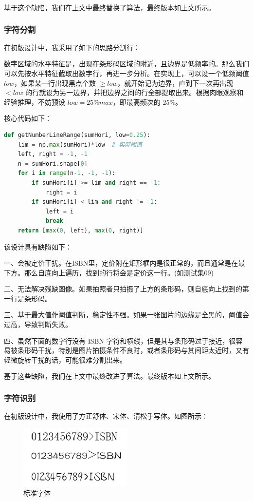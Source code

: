 \documentclass{ctexart}
\begin{document}
基于这个缺陷，我们在上文中最终替换了算法，最终版本如上文所示。

\subsubsection{字符分割}
在初版设计中，我采用了如下的思路分割行：

数字区域的水平特征是，出现在条形码区域的附近，且边界是低频率的。那么我们可以先按水平特征截取出数字行，再进一步分析。在实现上，可以设一个低频阈值 $low$，如果某一行出现黑点个数 $\ge low$，就开始记为边界，直到下一次再出现 $< low$ 的行就设为另一边界，并把边界之间的行全部提取出来。根据肉眼观察和经验推理，不妨预设 $low=25\%max$，即最高频次的 $25\%$。

核心代码如下：
\begin{lstlisting}[language=python]
def getNumberLineRange(sumHori, low=0.25):
    lim = np.max(sumHori)*low  # 实际阈值
    left, right = -1, -1
    n = sumHori.shape[0]
    for i in range(n-1, -1, -1):
        if sumHori[i] >= lim and right == -1:
            right = i
        if sumHori[i] < lim and right != -1:
            left = i
            break
    return [max(0, left), max(0, right)]
\end{lstlisting}

该设计具有缺陷如下：

一、会被定价干扰。在ISBN里，定价附在矩形框内是很正常的，而且通常是在最下方。那么自底向上遍历，找到的行将会是定价这一行。(如测试集09)

二、无法解决残缺图像。如果拍照者只拍摄了上方的条形码，则自底向上找到的第一行是条形码。

三、基于最大值作阈值判断，稳定性不强。如果一张图片的边缘是全黑的，阈值会过高，导致判断失败。

四、虽然下面的数字行没有 ISBN 字符和横线，但是其与条形码过于接近，很容易被条形码干扰，特别是图片拍摄条件不良时，或者条形码与其间距太近时，又有轻微旋转干扰的话，可能很难分割出来。

基于这些缺陷，我们在上文中最终改进了算法。最终版本如上文所示。

\subsubsection{字符识别}
在初版设计中，我使用了方正舒体、宋体、清松手写体。如图所示：

\begin{figure}[H]
    \centering
    \includegraphics[height=90pt]{standard_fonts}
    \caption{标准字体}
\end{figure}
\end{document}
